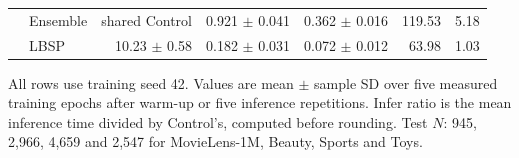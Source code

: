 \begin{table}[!htbp]
\begin{tabular*}{\textwidth}{@{\extracolsep{\fill}}llrrrrr@{}}
 & Ensemble & shared Control & 0.921 $\pm$ 0.041 & 0.362 $\pm$ 0.016 & 119.53 & 5.18\\ %
 & LBSP & 10.23 $\pm$ 0.58 & 0.182 $\pm$ 0.031 & 0.072 $\pm$ 0.012 & 63.98 & 1.03\\ %
\bottomrule
\end{tabular*}
\par\smallskip\noindent\begin{minipage}{\textwidth}\fontsize{8.5}{11}\selectfont All rows use training seed 42. Values are mean $\pm$ sample SD over five measured training epochs after warm-up or five inference repetitions. Infer ratio is the mean inference time divided by Control's, computed before rounding. Test $N$: 945, 2,966, 4,659 and 2,547 for MovieLens-1M, Beauty, Sports and Toys.
\end{minipage}
\end{table}
